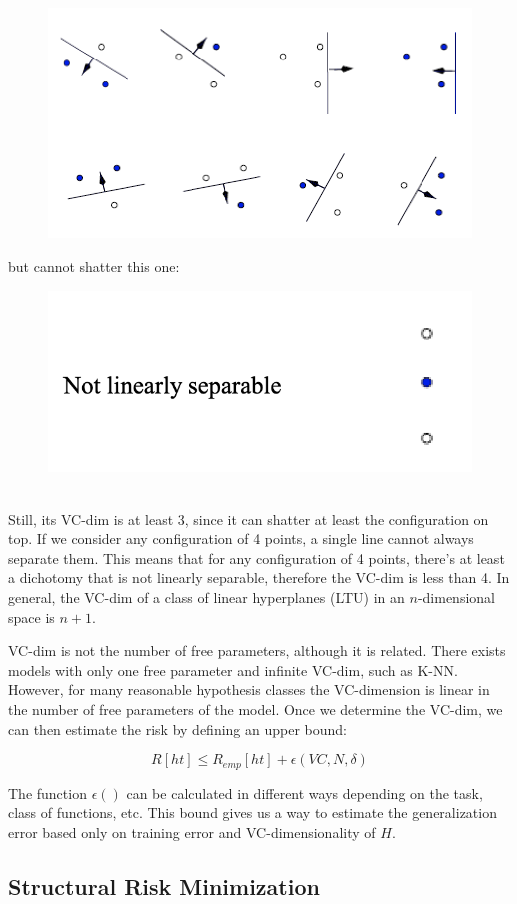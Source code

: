\begin{figure}[ht]
    \centering
    \includegraphics[width=0.5\linewidth]{img/shattering_1.png} 
\end{figure}
but cannot shatter this one:
\begin{figure}[ht]
    \centering
    \includegraphics[width=0.5\linewidth]{img/Shattering_2.png}
\end{figure}\\
Still, its VC-dim is at least 3, since it can shatter at least the configuration on top. If we consider any configuration of 4 points, a single line cannot always separate them. This means that for any configuration of 4 points, there's at least a dichotomy that is not linearly separable, therefore the VC-dim is less than 4. In general, the VC-dim of a class of linear hyperplanes (LTU) in an $n$-dimensional space is $n+1$.

VC-dim is not the number of free parameters, although it is related. There exists models with only one free parameter and infinite VC-dim, such as K-NN. However, for many reasonable hypothesis classes the VC-dimension is linear in the number of free parameters of the model. Once we determine the VC-dim, we can then estimate the risk by defining an upper bound:

\begin{equation*}
    R[ht] \leq R_{emp}[ht] + \epsilon (VC,N,\delta)
\end{equation*}

The function $\epsilon()$ can be calculated in different ways depending on the task, class of functions, etc. This bound gives us a way to estimate the generalization error based only on training error and VC-dimensionality of $H$.

\subsection{Structural Risk Minimization}

